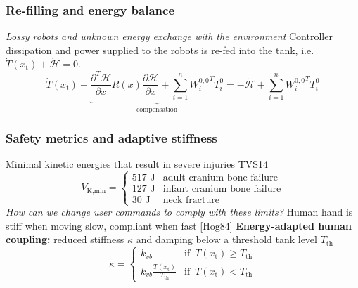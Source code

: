 \documentclass[student]{ITRslides}
\newcommand{\g}[1]{\text{#1}}
\begin{document}
\begin{frame}
	\frametitle{Re-filling and energy balance}
	\begin{figure}[b!]
		\centering
		\footnotesize
		\def\svgwidth{0.95\columnwidth}
						
	\end{figure}
	\textit{Lossy robots and unknown energy exchange with the environment}
	Controller dissipation and power supplied to the robots is re-fed into the tank, i.e. $\dot{T}(x_\g{t})+\dot{\mathcal{H}}=0$.
	\[
	\dot{T}(x_\g{t}) + \underbrace{\frac{\partial^T \mathcal{H}}{\partial x}R(x)\frac{\partial \mathcal{H}}{\partial x} + \sum_{i=1}^n {W_i^{0,0}}^T T_i^0}_{\text{compensation}} = - \dot{{\mathcal{H}}} + \sum_{i=1}^n {W_i^{0,0}}^T T_i^0
	\] 
\end{frame}

\begin{frame}
	\frametitle{Safety metrics and adaptive stiffness}
	Minimal kinetic energies that result in severe injuries \nocite{Tadele_14}{\tiny TVS14}
	\[
	V_{\g{K,min}} = 
	\begin{cases}
	517 \text{ J} & \text{adult cranium bone failure} \\
	127 \text{ J} & \text{infant cranium bone failure} \\
	30 \text{ J} & \text{neck fracture}
	\end{cases}
	\]
	\textit{How can we change user commands to comply with these limits?}
	Human hand is stiff when moving slow, compliant when fast \nocite{[Hog84b]}{\tiny [Hog84]}
	\textbf{Energy-adapted human coupling:} reduced stiffness $\kappa$ and damping below a threshold tank level $T_{\g{th}}$
	\[
	\kappa = \begin{cases}
	k_{vb} & \text{if } \, T(x_\g{t})\geq T_{\g{th}} \\
	k_{vb} \frac{T(x_\g{t})}{T_{\g{th}}} & \text{if } \, T(x_\g{t}) < T_{\g{th}}
	\end{cases} \]
	\end{frame}
\end{document}

